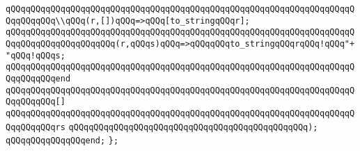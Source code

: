 \verb|qQQqqQQqqQQqqQQqqQQqqQQqqQQqqQQqqQQqqQQqqQQqqQQqqQQqqQQqqQQqqQQqqQQqqQQqqQQqqQQq\\qQQq(r,[])qQQq=>qQQq[to_stringqQQqr];|\newline
\verb|qQQqqQQqqQQqqQQqqQQqqQQqqQQqqQQqqQQqqQQqqQQqqQQqqQQqqQQqqQQqqQQqqQQqqQQqqQQqqQQqqQQqqQQqqQQq(r,qQQqs)qQQq=>qQQqqQQqto_stringqQQqrqQQq!qQQq"+"qQQq!qQQqs;|\newline
\verb|qQQqqQQqqQQqqQQqqQQqqQQqqQQqqQQqqQQqqQQqqQQqqQQqqQQqqQQqqQQqqQQqqQQqqQQqqQQqqQQqend|\newline
\newline
\verb|qQQqqQQqqQQqqQQqqQQqqQQqqQQqqQQqqQQqqQQqqQQqqQQqqQQqqQQqqQQqqQQqqQQqqQQqqQQqqQQq[]|\newline
\verb|qQQqqQQqqQQqqQQqqQQqqQQqqQQqqQQqqQQqqQQqqQQqqQQqqQQqqQQqqQQqqQQqqQQqqQQqqQQqqQQqrs|\newline
\verb|qQQqqQQqqQQqqQQqqQQqqQQqqQQqqQQqqQQqqQQqqQQqqQQq);|\newline
\verb|qQQqqQQqqQQqqQQqend;|\newline
\verb|};|\newline

